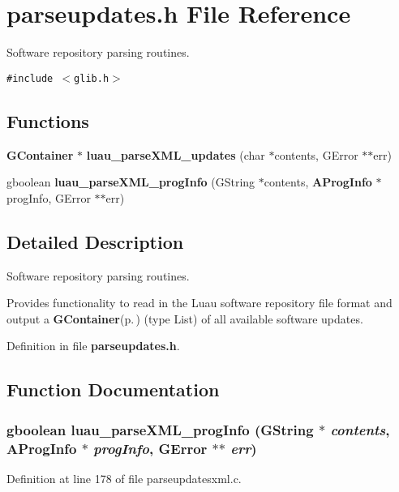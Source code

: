\section{parseupdates.h File Reference}
\label{parseupdates_8h}
Software repository parsing routines.  


{\tt \#include $<$glib.h$>$}\par
\subsection*{Functions}
\begin{CompactItemize}
\item 
{\bf GContainer} $\ast$ {\bf luau\_\-parse\-XML\_\-updates} (char $\ast$contents, GError $\ast$$\ast$err)
\item 
gboolean {\bf luau\_\-parse\-XML\_\-prog\-Info} (GString $\ast$contents, {\bf AProg\-Info} $\ast$prog\-Info, GError $\ast$$\ast$err)
\end{CompactItemize}


\subsection{Detailed Description}
Software repository parsing routines. 

Provides functionality to read in the Luau software repository file format and output a {\bf GContainer}{\rm (p.\,\pageref{structGContainer})} (type List) of all available software updates.

Definition in file {\bf parseupdates.h}.

\subsection{Function Documentation}
\subsubsection{\setlength{\rightskip}{0pt plus 5cm}gboolean luau\_\-parse\-XML\_\-prog\-Info (GString $\ast$ {\em contents}, {\bf AProg\-Info} $\ast$ {\em prog\-Info}, GError $\ast$$\ast$ {\em err})}\label{parseupdates_8h_a1}




Definition at line 178 of file parseupdatesxml.c.

